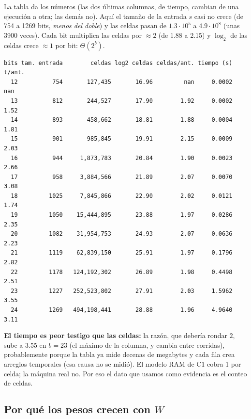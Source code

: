 \documentclass[11pt]{article}
\begin{document}
La tabla da los números (las dos últimas columnas, de tiempo, cambian de una ejecución a otra; las demás no). Aquí el tamaño de la entrada $s$ casi no crece (de 754 a 1269 bits, \emph{menos del
doble}) y las celdas pasan de $1.3\cdot10^5$ a $4.9\cdot10^8$ (unas 3900 veces). Cada bit multiplica las
celdas por $\approx2$ (de 1.88 a 2.15) y $\log_2$ de las celdas crece $\approx1$ por bit: $\Theta(2^b)$.
\begin{lstlisting}[style=salida,basicstyle=\ttfamily\footnotesize\color{black},columns=fixed]
bits tam. entrada        celdas log2 celdas celdas/ant. tiempo (s) t/ant.
  12          754       127,435       16.96         nan     0.0002    nan
  13          812       244,527       17.90        1.92     0.0002   1.52
  14          893       458,662       18.81        1.88     0.0004   1.81
  15          901       985,845       19.91        2.15     0.0009   2.03
  16          944     1,873,783       20.84        1.90     0.0023   2.66
  17          958     3,884,566       21.89        2.07     0.0070   3.08
  18         1025     7,845,866       22.90        2.02     0.0121   1.74
  19         1050    15,444,895       23.88        1.97     0.0286   2.35
  20         1082    31,954,753       24.93        2.07     0.0636   2.23
  21         1119    62,839,150       25.91        1.97     0.1796   2.82
  22         1178   124,192,302       26.89        1.98     0.4498   2.51
  23         1227   252,523,802       27.91        2.03     1.5962   3.55
  24         1269   494,198,441       28.88        1.96     4.9640   3.11
\end{lstlisting}
\textbf{El tiempo es peor testigo que las celdas:} la razón, que debería rondar $2$, sube a 3.55 en $b=23$
(el máximo de la columna, y cambia entre corridas), probablemente porque la tabla ya mide decenas de megabytes y
cada fila crea arreglos temporales (esa causa no se midió). El modelo RAM de C1 cobra 1 por celda; la
máquina real no. Por eso el dato que usamos como evidencia es el conteo de celdas.

\subsection*{Por qué los pesos crecen con $W$}
\end{document}
